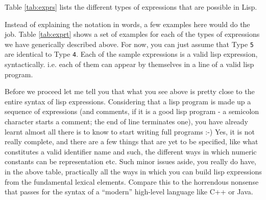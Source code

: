 \documentclass[10pt]{article}
\begin{document}
Table \ref{tab:exprs} lists the different types of expressions that are
possible in Lisp.  

Instead of explaining the notation in words, a few examples here would do the
job.  Table \ref{tab:exprt} shows a set of examples for each of the types of
expressions we have generically described above.  For now, you can just assume
that Type \texttt{5} are identical to Type \texttt{4}.  Each of the sample
expressions is a valid lisp expression, syntactically.  i.e. each of them can
appear by themselves in a line of a valid lisp program.

Before we proceed let me tell you that what you see above is pretty close to
the entire syntax of lisp expressions.  Considering that a lisp program is made
up a sequence of expressions (and comments, if it is a good lisp program - a
semicolon character starts a comment; the end of line terminates one), you have
already learnt almost all there is to know to start writing full programs :-)
Yes, it is not really complete, and there are a few things that are yet to be
specified, like what constitutes a valid identifier name and such, the
different ways in which numeric constants can be representation etc.  Such
minor issues aside, you really do have, in the above table, practically all the
ways in which you can build lisp expressions from the fundamental lexical
elements.  Compare this to the horrendous nonsense that passes for the syntax
of a ``modern'' high-level language like C++ or Java.
\end{document}
